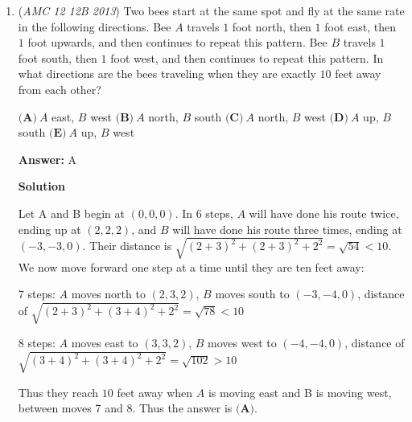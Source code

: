 \begin{enumerate}
 



\textbf{Solution 4 (Invariance)}

Suppose we set the values of the coins: Red = 4, Blue = 3, Silver = 5. This way, whenever an exchange is made, Alex's total value in coins does not change. His total value at the beginning (and thus also at the end) is $3\cdot 75+4\cdot 75=525$, so his theoretical possible total (if everything works out perfectly) is 105.

 Note that the maximum possible leftover red coins is 1, and the maximum possible leftover blue coins is 2, so the maximum leftover non-silver value is 10. This perfectly gives us 103 silver coins.

 


	\item (\textit{AMC 12 12B 2013}) Two bees start at the same spot and fly at the same rate in the following directions. Bee $A$ travels $1$ foot north, then $1$ foot east, then $1$ foot upwards, and then continues to repeat this pattern. Bee $B$ travels $1$ foot south, then $1$ foot west, and then continues to repeat this pattern. In what directions are the bees traveling when they are exactly $10$ feet away from each other?


 $\textbf{(A)}\ A$ east, $B$ west
$\textbf{(B)}\ A$ north, $B$ south
$\textbf{(C)}\ A$ north, $B$ west
$\textbf{(D)}\ A$ up, $B$ south
$\textbf{(E)}\ A$ up, $B$ west



 
 \textbf{Answer: }A



\textbf{Solution}

Let A and B begin at $(0,0,0)$. In $6$ steps, $A$ will have done his route twice, ending up at $(2,2,2)$, and $B$ will have done his route three times, ending at $(-3,-3,0)$. Their distance is $\sqrt{(2+3)^2+(2+3)^2+2^2}=\sqrt{54} < 10$. We now move forward one step at a time until they are ten feet away:

 7 steps: $A$ moves north to $(2,3,2)$, $B$ moves south to $(-3,-4,0)$, distance of $\sqrt{(2+3)^2+(3+4)^2+2^2}=\sqrt{78} < 10$

 8 steps: $A$ moves east to $(3,3,2)$, $B$ moves west to $(-4,-4,0)$, distance of $\sqrt{(3+4)^2+(3+4)^2+2^2}=\sqrt{102}>10$

 Thus they reach $10$ feet away when $A$ is moving east and B is moving west, between moves 7 and 8. Thus the answer is  $\boxed{\textbf{(A)}}$.


\end{enumerate}
